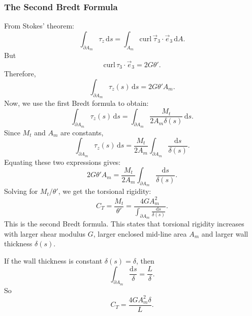 \subsubsection{The Second Bredt Formula}
From Stokes' theorem:
\begin{equation*}
  \int_{\partial A_m} \tau_z \, \mathrm{d}s = \int_{A_m} \mathrm{curl} \, \Vec{\tau}_3 \cdot \Vec{e}_3 \, \mathrm{d}A
.\end{equation*}
But
\begin{equation*}
  \mathrm{curl} \,  \tau_3 \cdot \Vec{e}_3 = 2G \theta'
.\end{equation*}
Therefore,
\begin{equation*}
  \int_{\partial A_m} \tau_z(s) \, \mathrm{d}s = 2 G\theta' A_m
.\end{equation*}
Now, we use the first Bredt formula to obtain:
\begin{equation*}
  \int _{\partial A_m} \tau_z(s) \, \mathrm{d}s = \int_{\partial A_m} \frac{M_t}{2 A_m \delta(s)} \, \mathrm{d}s
.\end{equation*}
Since $M_t$ and $A_m$ are constants,
\begin{equation*}
  \int_{\partial A_m} \tau_z (s) \, \mathrm{d}s = \frac{M_t}{2 A_m} \int_{\partial A_m} \frac{\mathrm{d}s}{\delta(s)}
.\end{equation*}
Equating these two expressions gives:
\begin{equation*}
  2 G\theta' A_m = \frac{M_t}{2A_m} \int_{\partial A_m} \frac{\mathrm{d}s}{\delta(s)}
.\end{equation*}
Solving for $M_t / \theta'$, we get the torsional rigidity:
\begin{equation*}
  C_T = \frac{M_t}{\theta'} = \frac{4GA_m^2}{\int_{\partial A_m} \frac{\mathrm{d}s}{\delta(s)}}
.\end{equation*}
This is the second Bredt formula.
This states that torsional rigidity increases with larger shear modulus $G$, larger enclosed mid-line area $A_m$ and larger wall thickness $\delta(s)$.

If the wall thickness is constant $\delta(s) = \delta$, then
\begin{equation*}
  \int_{\partial A_m} \frac{\mathrm{d}s}{\delta} = \frac{L}{\delta}
.\end{equation*}
So
\begin{equation*}
  C_T = \frac{4 G A_m^2 \delta}{L}
.\end{equation*}


